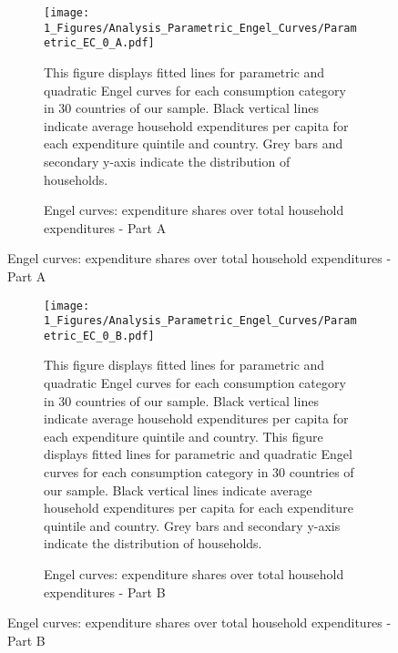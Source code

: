\begin{figure}[ht!]
  \centering
  \caption{Engel curves: expenditure shares over total household expenditures} \label{fig:Engel}
  \begin{subfigure}[b]{\textwidth}
  \centering
    \caption{Engel curves: expenditure shares over total household expenditures - Part A} \label{fig:Engel_1}
  \texttt{[image: 1\_Figures/Analysis\_Parametric\_Engel\_Curves/Parametric\_EC\_0\_A.pdf]}
  \begin{subcaption2}
    This figure displays fitted lines for parametric and quadratic Engel curves for each consumption category in 30 countries of our sample. Black vertical lines indicate average household expenditures per capita for each expenditure quintile and country. Grey bars and secondary y-axis indicate the distribution of households.
  \end{subcaption2}
  \end{subfigure}
\end{figure}

\clearpage

\begin{figure}[ht!]\ContinuedFloat
   \begin{subfigure}[b]{\textwidth}
  \centering
      \caption{Engel curves: expenditure shares over total household expenditures - Part B} \label{fig:Engel_2}
  \texttt{[image: 1\_Figures/Analysis\_Parametric\_Engel\_Curves/Parametric\_EC\_0\_B.pdf]}
  \begin{subcaption2}
    This figure displays fitted lines for parametric and quadratic Engel curves for each consumption category in 30 countries of our sample. Black vertical lines indicate average household expenditures per capita for each expenditure quintile and country. This figure displays fitted lines for parametric and quadratic Engel curves for each consumption category in 30 countries of our sample. Black vertical lines indicate average household expenditures per capita for each expenditure quintile and country. Grey bars and secondary y-axis indicate the distribution of households.
  \end{subcaption2}
\end{subfigure}
\end{figure}

\clearpage

